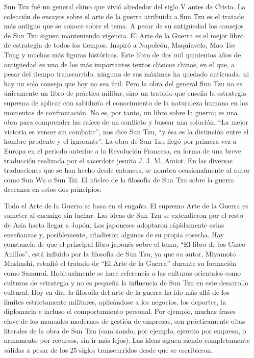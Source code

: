 \documentclass[openany]{book}
\begin{document}
\vspace{2mm}
\thispagestyle{empty}
{
Sun Tzu fué un general chino que vivió alrededor del siglo V antes de Cristo. La colección de ensayos sobre el arte de la guerra atribuida a Sun Tzu es el tratado más antiguo que se conoce sobre el tema. A pesar de su antigüedad los consejos de Sun Tzu siguen manteniendo vigencia.
El Arte de la Guerra es el mejor libro de estrategia de todos los tiempos. Inspiró a Napoleón, Maquiavelo, Mao Tse Tung y muchas más figuras históricas. Este libro de dos mil quinientos años de antigüedad es uno de los más importantes textos clásicos chinos, en el que, a pesar del tiempo transcurrido, ninguna de sus máximas ha quedado anticuada, ni hay un solo consejo que hoy no sea útil. Pero la obra del general Sun Tzu no es únicamente un libro de práctica militar, sino un tratado que enseña la estrategia suprema de aplicar con sabiduría el conocimiento de la naturaleza humana en los momentos de confrontación. No es, por tanto, un libro sobre la guerra; es una obra para comprender las raíces de un conflicto y buscar una solución. ``La mejor victoria es vencer sin combatir'', nos dice Sun Tzu, ``y ésa es la distinción entre el hombre prudente y el ignorante''.
La obra de Sun Tzu llegó por primera vez a Europa en el periodo anterior a la Revolución Francesa, en forma de una breve traducción realizada por el sacerdote jesuita J. J. M. Amiot. En las diversas traducciones que se han hecho desde entonces, se nombra ocasionalmente al autor como Sun Wu o Sun Tzi.
El núcleo de la filosofía de Sun Tzu sobre la guerra descansa en estos dos principios:

Todo el Arte de la Guerra se basa en el engaño. El supremo Arte de la Guerra es someter al enemigo sin luchar.
Las ideas de Sun Tzu se extendieron por el resto de Asia hasta llegar a Japón. Los japoneses adoptaron rápidamente estas enseñanzas y, posiblemente, añadieron algunas de su propia cosecha. Hay constancia de que el principal libro japonés sobre el tema, ``El libro de los Cinco Anillos'', está influido por la filosofía de Sun Tzu, ya que su autor, Miyamoto Mushashi, estudió el tratado de ``El Arte de la Guerra'' durante su formación como Samurai.
Habitualmente se hace referencia a las culturas orientales como culturas de estrategia y no es pequeña la influencia de Sun Tzu en este desarrollo cultural. Hoy en día, la filosofía del arte de la guerra ha ido más allá de los límites estrictamente militares, aplicándose a los negocios, los deportes, la diplomacia e incluso el comportamiento personal. Por ejemplo, muchas frases clave de los manuales modernos de gestión de empresas, son prácticamente citas literales de la obra de Sun Tzu (cambiando, por ejemplo, ejercito por empresa, o armamento por recursos, sin ir más lejos). Las ideas siguen siendo completamente válidas a pesar de los 25 siglos transcurridos desde que se escribieron.
}
\end{document}
